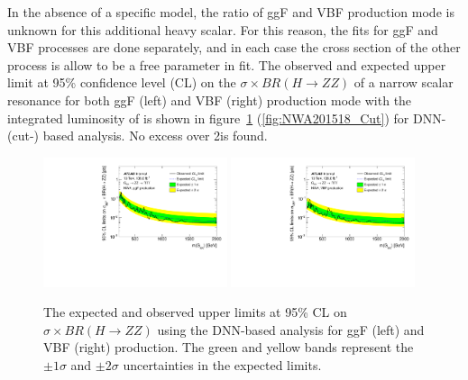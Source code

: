 In the absence of a specific model, the ratio of ggF and VBF production mode is unknown for this additional heavy scalar.
For this reason, the fits for ggF and VBF processes are done separately, and in each case the cross section of the other process is allow to be a free parameter in fit.
The observed and expected upper limit at 95\% confidence level (CL) on the $\sigma \times BR(H \rightarrow ZZ)$ of a narrow scalar resonance for both ggF (left) and VBF (right) production mode with the integrated luminosity of \lumi is shown in figure~\ref{fig:NWA201518_DNN} (\ref{fig:NWA201518_Cut}) for DNN- (cut-) based analysis.
No excess over 2\sigma is found.

\begin{figure}[h]
    \centering
    \includegraphics[width=0.48\textwidth]{figures/HMHZZ/results/limits_DNN_ggF.pdf}
    \includegraphics[width=0.48\textwidth]{figures/HMHZZ/results/limits_DNN_VBF.pdf}
    \caption{The expected and observed upper limits at 95\% CL on $\sigma \times BR(H \rightarrow ZZ)$ using the DNN-based analysis for ggF (left) and VBF (right) production. The green and yellow bands represent the $\pm 1\sigma$ and $\pm 2\sigma$ uncertainties in the expected limits.
 }
    \label{fig:NWA201518_DNN}
\end{figure}


